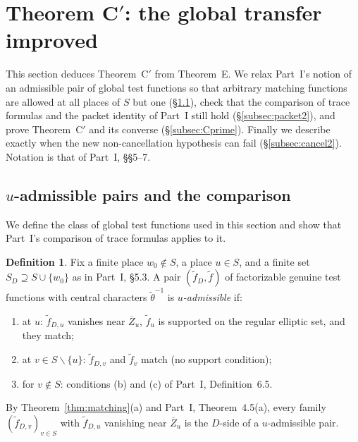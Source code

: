\documentclass[12pt]{article}
\newcommand{\ov}[1]{\overline{#1}}
\newcommand{\Zb}{\ov{Z}}
\theoremstyle{plain}
\theoremstyle{definition}
\newtheorem{definition}[theorem]{Definition}
\begin{document}
\section{Theorem C$'$: the global transfer improved}\label{sec:CC}
This section deduces Theorem~C$'$ from Theorem~E. We relax Part~I's notion of an admissible pair of global test functions so that arbitrary matching functions are allowed at all places of $S$ but one (\S\ref{subsec:uadm}), check that the comparison of trace formulas and the packet identity of Part~I still hold (\S\ref{subsec:packet2}), and prove Theorem~C$'$ and its converse (\S\ref{subsec:Cprime}). Finally we describe exactly when the new non-cancellation hypothesis can fail (\S\ref{subsec:cancel2}). Notation is that of Part~I, \S\S5--7.

\subsection{$u$-admissible pairs and the comparison}\label{subsec:uadm}
We define the class of global test functions used in this section and show that Part~I's comparison of trace formulas applies to it.

\begin{definition}\label{def:uadm}
Fix a finite place $w_0\notin S$, a place $u\in S$, and a finite set $S_D\supseteq S\cup\{w_0\}$ as in Part~I, \S5.3. A pair $(\tilde f_D,\tilde f)$ of factorizable genuine test functions with central characters $\tilde\theta^{-1}$ is \emph{$u$-admissible} if:
\begin{enumerate}[label=(\alph*)]
\item at $u$: $\tilde f_{D,u}$ vanishes near $\Zb_u$, $\tilde f_u$ is supported on the regular elliptic set, and they match;
\item at $v\in S\smallsetminus\{u\}$: $\tilde f_{D,v}$ and $\tilde f_v$ match (no support condition);
\item for $v\notin S$: conditions (b) and (c) of Part~I, Definition~6.5.
\end{enumerate}
\end{definition}

By Theorem~\ref{thm:matching}(a) and Part~I, Theorem~4.5(a), every family $(\tilde f_{D,v})_{v\in S}$ with $\tilde f_{D,u}$ vanishing near $\Zb_u$ is the $D$-side of a $u$-admissible pair.
\end{document}
